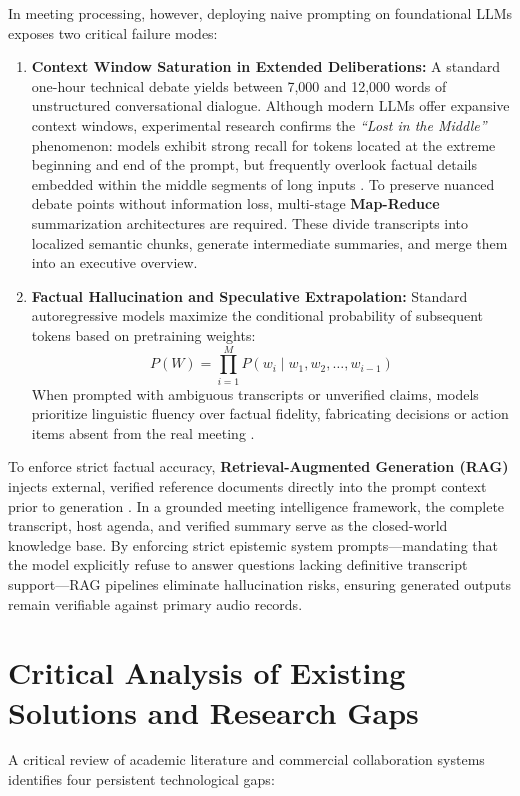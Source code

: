 \documentclass[12pt,oneside,letterpaper]{report}
\numberwithin{equation}{chapter} %
\begin{document}
In meeting processing, however, deploying naive prompting on foundational LLMs exposes two critical failure modes:

\begin{enumerate}
    \item \textbf{Context Window Saturation in Extended Deliberations:} A standard one-hour technical debate yields between 7,000 and 12,000 words of unstructured conversational dialogue. Although modern LLMs offer expansive context windows, experimental research confirms the \textit{``Lost in the Middle''} phenomenon: models exhibit strong recall for tokens located at the extreme beginning and end of the prompt, but frequently overlook factual details embedded within the middle segments of long inputs \cite{liu2024lost}. To preserve nuanced debate points without information loss, multi-stage \textbf{Map-Reduce} summarization architectures are required. These divide transcripts into localized semantic chunks, generate intermediate summaries, and merge them into an executive overview.
    
    \item \textbf{Factual Hallucination and Speculative Extrapolation:} Standard autoregressive models maximize the conditional probability of subsequent tokens based on pretraining weights:
    \begin{equation}
    P(W) = \prod_{i=1}^M P(w_i \mid w_1, w_2, \dots, w_{i-1})
    \label{eq:autoregressive_prob}
    \end{equation}
    When prompted with ambiguous transcripts or unverified claims, models prioritize linguistic fluency over factual fidelity, fabricating decisions or action items absent from the real meeting \cite{ji2023survey}.
\end{enumerate}

To enforce strict factual accuracy, \textbf{Retrieval-Augmented Generation (RAG)} injects external, verified reference documents directly into the prompt context prior to generation \cite{lewis2020retrieval}. In a grounded meeting intelligence framework, the complete transcript, host agenda, and verified summary serve as the closed-world knowledge base. By enforcing strict epistemic system prompts---mandating that the model explicitly refuse to answer questions lacking definitive transcript support---RAG pipelines eliminate hallucination risks, ensuring generated outputs remain verifiable against primary audio records.

\section{Critical Analysis of Existing Solutions and Research Gaps}
A critical review of academic literature and commercial collaboration systems identifies four persistent technological gaps:
\end{document}
